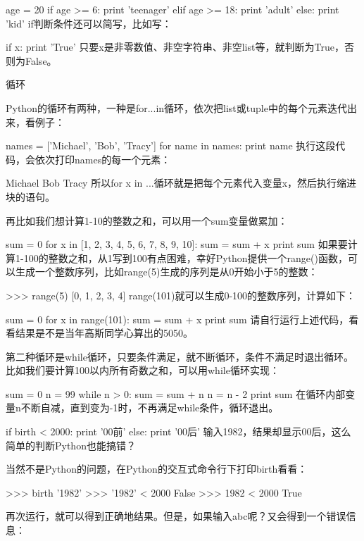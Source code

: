 age = 20
if age >= 6:
    print 'teenager'
elif age >= 18:
    print 'adult'
else:
    print 'kid'
if判断条件还可以简写，比如写：

if x:
    print 'True'
只要x是非零数值、非空字符串、非空list等，就判断为True，否则为False。

循环

Python的循环有两种，一种是for...in循环，依次把list或tuple中的每个元素迭代出来，看例子：

names = ['Michael', 'Bob', 'Tracy']
for name in names:
    print name
执行这段代码，会依次打印names的每一个元素：

Michael
Bob
Tracy
所以for x in ...循环就是把每个元素代入变量x，然后执行缩进块的语句。

再比如我们想计算1-10的整数之和，可以用一个sum变量做累加：

sum = 0
for x in [1, 2, 3, 4, 5, 6, 7, 8, 9, 10]:
    sum = sum + x
print sum
如果要计算1-100的整数之和，从1写到100有点困难，幸好Python提供一个range()函数，可以生成一个整数序列，比如range(5)生成的序列是从0开始小于5的整数：

>>> range(5)
[0, 1, 2, 3, 4]
range(101)就可以生成0-100的整数序列，计算如下：

sum = 0
for x in range(101):
    sum = sum + x
print sum
请自行运行上述代码，看看结果是不是当年高斯同学心算出的5050。

第二种循环是while循环，只要条件满足，就不断循环，条件不满足时退出循环。比如我们要计算100以内所有奇数之和，可以用while循环实现：

sum = 0
n = 99
while n > 0:
    sum = sum + n
    n = n - 2
print sum
在循环内部变量n不断自减，直到变为-1时，不再满足while条件，循环退出。



if birth < 2000:
    print '00前'
else:
    print '00后'
输入1982，结果却显示00后，这么简单的判断Python也能搞错？

当然不是Python的问题，在Python的交互式命令行下打印birth看看：

>>> birth
'1982'
>>> '1982' < 2000
False
>>> 1982 < 2000
True

再次运行，就可以得到正确地结果。但是，如果输入abc呢？又会得到一个错误信息：

